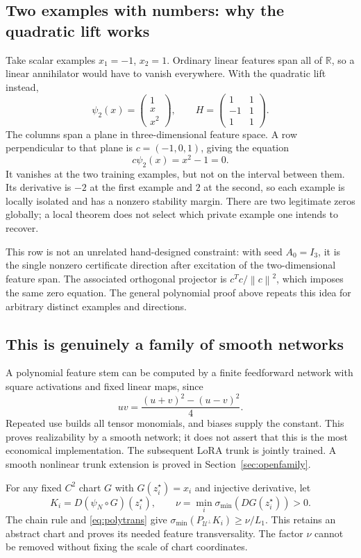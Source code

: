 \documentclass[12pt,a4paper]{article}
\theoremstyle{readable}
\theoremstyle{definition}\newtheorem{example}[theorem]{Example}
\newcommand{\R}{\mathbb R}\newcommand{\rank}{\operatorname{rank}}
\newcommand{\norm}[1]{\left\|#1\right\|}
\begin{document}
\subsection{Two examples with numbers: why the quadratic lift works}
Take scalar examples \(x_1=-1\), \(x_2=1\). Ordinary linear features span all of \(\R\), so a linear annihilator would have to vanish everywhere. With the quadratic lift instead,
\[
\psi_2(x)=\begin{pmatrix}1\\x\\x^2\end{pmatrix},\qquad
H=\begin{pmatrix}1&1\\-1&1\\1&1\end{pmatrix}.
\]
The columns span a plane in three-dimensional feature space. A row perpendicular to that plane is \(c=(-1,0,1)\), giving the equation
\[
c\psi_2(x)=x^2-1=0.
\]
It vanishes at the two training examples, but not on the interval between them. Its derivative is \(-2\) at the first example and \(2\) at the second, so each example is locally isolated and has a nonzero stability margin. There are two legitimate zeros globally; a local theorem does not select which private example one intends to recover.

This row is not an unrelated hand-designed constraint: with seed \(A_0=I_3\), it is the single nonzero certificate direction after excitation of the two-dimensional feature span. The associated orthogonal projector is \(c^Tc/\norm c^2\), which imposes the same zero equation. The general polynomial proof above repeats this idea for arbitrary distinct examples and directions.

\subsection{This is genuinely a family of smooth networks}
A polynomial feature stem can be computed by a finite feedforward network with square activations and fixed linear maps, since
\[
uv=\frac{(u+v)^2-(u-v)^2}{4}.
\]
Repeated use builds all tensor monomials, and biases supply the constant. This proves realizability by a smooth network; it does not assert that this is the most economical implementation. The subsequent LoRA trunk is jointly trained. A smooth nonlinear trunk extension is proved in Section~\ref{sec:openfamily}.

For any fixed \(C^2\) chart \(G\) with \(G(z_i^\star)=x_i\) and injective derivative, let
\[
K_i=D(\psi_N\circ G)(z_i^\star),\qquad
\nu=\min_i\sigma_{\min}(DG(z_i^\star))>0.
\]
The chain rule and \eqref{eq:polytrans} give
\(\sigma_{\min}(P_{\mathcal U^\perp}K_i)\ge\nu/L_1\).
This retains an abstract chart and proves its needed feature transversality. The factor \(\nu\) cannot be removed without fixing the scale of chart coordinates.
\end{document}
